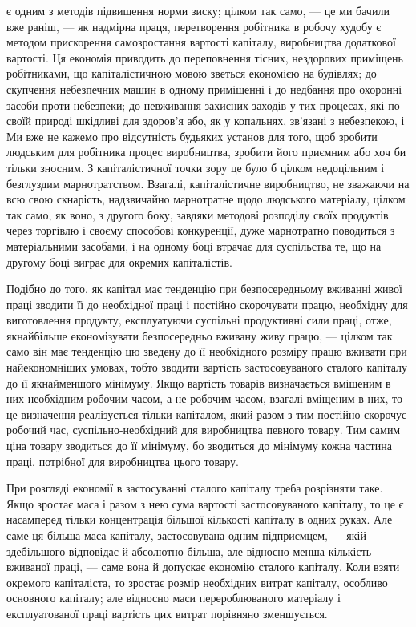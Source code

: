 \parcont{}  %
є одним з методів підвищення норми зиску; цілком так само, —
це ми бачили вже раніш, — як надмірна праця, перетворення
робітника в робочу худобу є методом прискорення самозростання вартості капіталу, виробництва
додаткової вартості.
Ця економія приводить до переповнення тісних, нездорових приміщень робітниками, що капіталістичною
мовою зветься економією на будівлях; до скупчення небезпечних машин в
одному приміщенні і до недбання про охоронні засоби проти
небезпеки; до невживання захисних заходів у тих процесах,
які по своїй природі шкідливі для здоров’я або, як у копальнях, зв’язані з небезпекою, і~ Ми
вже не кажемо про відсутність будьяких установ для того, щоб зробити людським для
робітника процес виробництва, зробити його приємним або хоч би
тільки зносним. З капіталістичної точки зору це було б цілком
недоцільним і безглуздим марнотратством. Взагалі, капіталістичне
виробництво, не зважаючи на всю свою скнарість, надзвичайно
марнотратне щодо людського матеріалу, цілком так само, як
воно, з другого боку, завдяки методові розподілу своїх продуктів через торгівлю і своєму способові
конкуренції, дуже марнотратно поводиться з матеріальними засобами, і на одному боці втрачає для
суспільства те, що на другому боці виграє для
окремих капіталістів.

Подібно до того, як капітал має тенденцію при безпосередньому вживанні живої праці зводити її до
необхідної праці і постійно скорочувати працю, необхідну для виготовлення продукту,
експлуатуючи суспільні продуктивні сили праці, отже, якнайбільше економізувати безпосередньо вживану
живу працю, —
цілком так само він має тенденцію цю зведену до її необхідного
розміру працю вживати при найекономніших умовах, тобто зводити вартість застосовуваного сталого
капіталу до її якнайменшого мінімуму. Якщо вартість товарів визначається вміщеним
в них необхідним робочим часом, а не робочим часом, взагалі
вміщеним в них, то це визначення реалізується тільки капіталом,
який разом з тим постійно скорочує робочий час, суспільно-необхідний
для виробництва певного товару. Тим самим ціна
товару зводиться до її мінімуму, бо зводиться до мінімуму кожна
частина праці, потрібної для виробництва цього товару.

При розгляді економії в застосуванні сталого капіталу треба
розрізняти таке. Якщо зростає маса і разом з нею сума вартості застосовуваного капіталу, то це є
насамперед тільки концентрація більшої кількості капіталу в одних руках. Але саме
ця більша маса капіталу, застосовувана одним підприємцем, —
якій здебільшого відповідає й абсолютно більша, але відносно
менша кількість вживаної праці, — саме вона й допускає економію сталого капіталу. Коли взяти
окремого капіталіста, то
зростає розмір необхідних витрат капіталу, особливо основного
капіталу; але відносно маси перероблюваного матеріалу і експлуатованої праці вартість цих витрат
порівняно зменшується.
